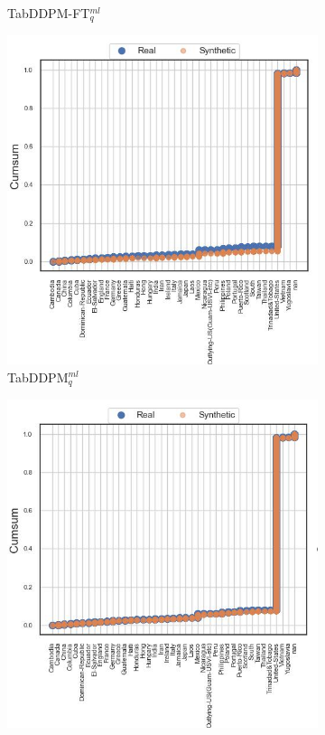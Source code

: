 \begin{figure}[H]
\begin{subfigure}{0.23\textwidth}
		\caption{TabDDPM-FT$^{ml}_q$}
	\end{subfigure}
	\begin{subfigure}{0.23\textwidth}
		\centering
		\includegraphics[width=\textwidth]{images/cdf/tab-ddpm.jpg}
		\caption{TabDDPM$^{ml}_q$}
	\end{subfigure}
	\begin{subfigure}{0.23\textwidth}
		\centering
		\includegraphics[width=\textwidth]{images/cdf/tab-ddpm-simTune-minmax.jpg}

\end{subfigure}
\end{figure}
